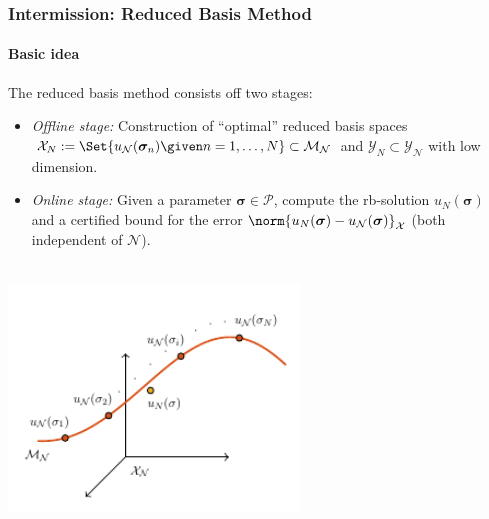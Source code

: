 \begin{frame}[t]
    \frametitle{Intermission: Reduced Basis Method}
    \framesubtitle{Basic idea}

    The reduced basis method consists off two stages:

    \begin{itemize}
        \item {} \emph{Offline stage:} Construction of \enquote{optimal} reduced basis spaces $\mathcal X_{N} := \Set{u_{\mathcal N}(\bm \sigma_n) \given n = 1, \dots, N} \subset \mathcal M_{\mathcal N}$ and $\mathcal Y_{N} \subset \mathcal Y_{\mathcal N}$ with low dimension.
        \item {} \emph{Online stage:} Given a parameter $\bm \sigma \in \mathcal P$, compute the rb-solution $u_{N}(\bm \sigma)$ and a certified bound for the error $\norm{u_{N}(\bm \sigma) - u_{\mathcal N}(\bm \sigma)}_{\mathcal X}$ (both independent of $\mathcal N$).
    \end{itemize}
    \centering
    $\;$\\[-3.7em]
     \includegraphics[width=0.58\textwidth]{figures/rb.pdf}
\end{frame}

